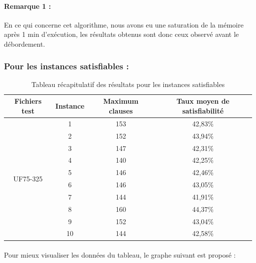 \paragraph{Remarque 1 :} \label{BreadthIssueExperience} En ce qui concerne cet algorithme, nous avons eu une saturation de la mémoire après 1 min d'exécution, les résultats obtenus sont donc ceux observé avant le débordement.
\subsubsection{Pour les instances satisfiables :}
\begin{table}[H]
	\centering
	\label{table:Tab_BFS_Sat}
	\begin{tabular}{|c|c|c|c|}
		\hline
		Fichiers test              & Instance & Maximum clauses & Taux  moyen de satisfiabilité \\ \hline
		\multirow{10}{*}{UF75-325} & 1        & 153             & 42,83\%                       \\ \cline{2-4} 
		& 2        & 152             & 43,94\%                       \\ \cline{2-4} 
		& 3        & 147             & 42,31\%                       \\ \cline{2-4} 
		& 4        & 140             & 42,25\%                       \\ \cline{2-4} 
		& 5        & 146             & 42,46\%                       \\ \cline{2-4} 
		& 6        & 146             & 43,05\%                       \\ \cline{2-4} 
		& 7        & 144             & 41,91\%                       \\ \cline{2-4} 
		& 8        & 160             & 44,37\%                       \\ \cline{2-4} 
		& 9        & 152             & 43,04\%                       \\ \cline{2-4} 
		& 10       & 144             & 42,58\%                       \\ \hline
	\end{tabular}
	\caption{Tableau récapitulatif des résultats pour les instances satisfiables}
\end{table}
\paragraph{}Pour mieux visualiser les données du tableau, le graphe suivant est proposé :\\


